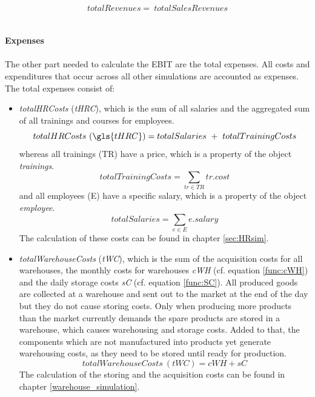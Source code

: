 \begin{equation}
\label{func:totalRevenue}
    totalRevenues = ~totalSalesRevenues 
\end{equation}\\
\\
\textbf{Expenses}\\
\\
The other part needed to calculate the EBIT are the total expenses. All costs and expenditures that occur across all other simulations are accounted as expenses. The total expenses consist of:
\begin{itemize}
    \item \textit{totalHRCosts} (\textit{tHRC}), which is the sum of all salaries and the aggregated sum of all trainings and courses for employees. 
    \begin{equation}
        totalHRCosts~(\gls{tHRC}) = totalSalaries \ + \  totalTrainingCosts
    \end{equation}
    whereas all trainings (\gls{TR}) have a price, which is a property of the object \textit{trainings}.
    \begin{equation}
        totalTrainingCosts = \sum_{tr \in TR} tr.cost
    \end{equation}
    and all employees (\gls{E}) have a specific salary, which is a property of the object \textit{employee}.
     \begin{equation}
        totalSalaries = \sum_{e\in E} e.salary
    \end{equation}
    The calculation of these costs can be found in chapter \ref{sec:HRsim}.
    \item \textit{totalWarehouseCosts} (\textit{tWC}), which is the sum of the acquisition costs for all warehouses, the monthly costs for warehouses \textit{cWH} (cf. equation \ref{func:cWH}) and the daily storage costs \textit{sC} (cf. equation \ref{func:SC}). All produced goods are collected at a warehouse and sent out to the market at the end of the day but they do not cause storing costs. Only when producing more products than the market currently demands the spare products are stored in a warehouse, which causes warehousing and storage costs. Added to that, the components which are not manufactured into products yet generate warehousing costs, as they need to be stored until ready for production. 
    \begin{equation}
        totalWarehouseCosts~(tWC) = cWH + sC
    \end{equation}
    The calculation of the storing and the acquisition costs can be found in chapter \ref{warehouse_simulation}. 

\end{itemize}
